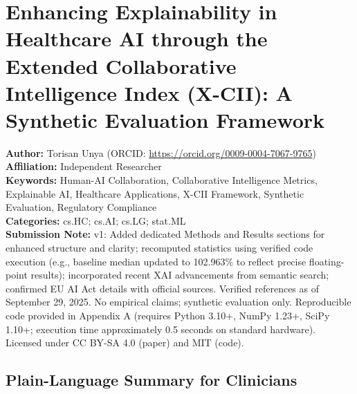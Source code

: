 \documentclass[a4paper]{article}
\begin{document}

\section{Enhancing Explainability in Healthcare AI through the Extended
Collaborative Intelligence Index (X-CII): A Synthetic Evaluation
Framework}\label{enhancing-explainability-in-healthcare-ai-through-the-extended-collaborative-intelligence-index-x-cii-a-synthetic-evaluation-framework}

\textbf{Author:} Torisan Unya (ORCID: \url{https://orcid.org/0009-0004-7067-9765})\\
\textbf{Affiliation:} Independent Researcher\\
\textbf{Keywords:} Human-AI Collaboration, Collaborative Intelligence
Metrics, Explainable AI, Healthcare Applications, X-CII Framework,
Synthetic Evaluation, Regulatory Compliance\\
\textbf{Categories:} cs.HC; cs.AI; cs.LG; stat.ML\\
\textbf{Submission Note:} v1: Added dedicated Methods and Results
sections for enhanced structure and clarity; recomputed statistics using
verified code execution (e.g., baseline median updated to 102.963\% to
reflect precise floating-point results); incorporated recent XAI
advancements from semantic search; confirmed EU AI Act details with
official sources. Verified references as of September 29, 2025. No
empirical claims; synthetic evaluation only. Reproducible code provided
in Appendix A (requires Python 3.10+, NumPy 1.23+, SciPy 1.10+;
execution time approximately 0.5 seconds on standard hardware). Licensed
under CC BY-SA 4.0 (paper) and MIT (code).

\subsection{Plain-Language Summary for
Clinicians}\label{plain-language-summary-for-clinicians}
\end{document}
